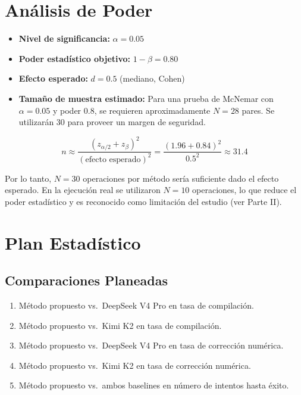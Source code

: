 \documentclass[12pt]{article}
\begin{document}
\section{Análisis de Poder}

\begin{itemize}
  \item \textbf{Nivel de significancia:} $\alpha = 0.05$
  \item \textbf{Poder estadístico objetivo:} $1 - \beta = 0.80$
  \item \textbf{Efecto esperado:} $d = 0.5$ (mediano, Cohen)
  \item \textbf{Tamaño de muestra estimado:} Para una prueba de McNemar con $\alpha=0.05$
    y poder $0.8$, se requieren aproximadamente $N = 28$ pares. Se utilizarán 30 para
    proveer un margen de seguridad.
\end{itemize}

\[
n \approx \frac{(z_{\alpha/2} + z_{\beta})^2}{(\text{efecto esperado})^2}
= \frac{(1.96 + 0.84)^2}{0.5^2} \approx 31.4
\]

Por lo tanto, $N = 30$ operaciones por método sería suficiente dado el efecto esperado.
En la ejecución real se utilizaron $N = 10$ operaciones, lo que reduce el poder
estadístico y es reconocido como limitación del estudio (ver Parte II).

\section{Plan Estadístico}

\subsection{Comparaciones Planeadas}

\begin{enumerate}
  \item Método propuesto vs.\ DeepSeek V4 Pro en tasa de compilación.
  \item Método propuesto vs.\ Kimi K2 en tasa de compilación.
  \item Método propuesto vs.\ DeepSeek V4 Pro en tasa de corrección numérica.
  \item Método propuesto vs.\ Kimi K2 en tasa de corrección numérica.
  \item Método propuesto vs.\ ambos baselines en número de intentos hasta éxito.
\end{enumerate}
\end{document}
